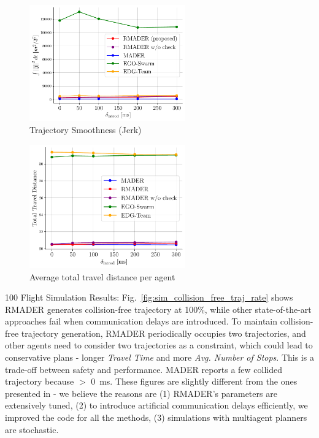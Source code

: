 \begin{figure}
    \centering
    \includegraphics[width=0.6\textwidth]{figures/traj_smoothness_jer.pdf}
    \caption{\centering Trajectory Smoothness (Jerk)}
    \label{fig:traj_smoothness_jerk}
\end{figure}

\begin{figure}
    \centering
    \includegraphics[width=0.6\textwidth]{figures/total_dist.pdf}
    \caption{\centering Average total travel distance per agent}
    \label{fig:total_dist}
\end{figure}

100 Flight Simulation Results: Fig.~\ref{fig:sim_collision_free_traj_rate} shows RMADER generates collision-free trajectory at 100\%, while other state-of-the-art approaches fail when communication delays are introduced. 
    To maintain collision-free trajectory generation, RMADER periodically occupies two trajectories, and other agents need to consider two trajectories as a constraint, which could lead to conservative plans - longer \emph{Travel Time} and more \emph{Avg. Number of Stops}. 
    This is a trade-off between safety and performance. MADER reports a few collided trajectory because \delayActual{} $>$ \SI{0}{\ms}. These figures are slightly different from the ones presented in \cite{kondo2022robust} - we believe the reasons are (1) RMADER's parameters are extensively tuned, (2) to introduce artificial communication delays efficiently, we improved the code for all the methods, (3) simulations with multiagent planners are stochastic.

